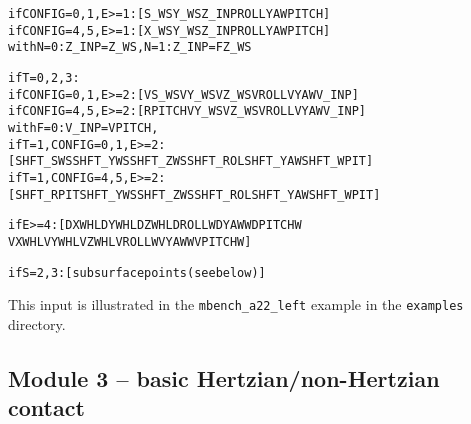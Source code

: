 \documentclass[12pt]{report}
\renewcommand{\magenta}[1]{}
\begin{document}
\begin{alltt}
if CONFIG=0,1, E>=1: [ S\_WS    Y\_WS    Z\_INP  ROLL    YAW    PITCH    ]
if CONFIG=4,5, E>=1: [ X\_WS    Y\_WS    Z\_INP  ROLL    YAW    PITCH    ]
   with  N=0:\magenta{  } Z\_INP = Z\_WS,   N=1: Z\_INP = FZ\_WS

if T=0,2,3:
if CONFIG=0,1, E>=2: [ VS\_WS   VY\_WS   VZ\_WS  VROLL   VYAW   V\_INP    ]
if CONFIG=4,5, E>=2: [ RPITCH  VY\_WS   VZ\_WS  VROLL   VYAW   V\_INP    ]
   with  F=0\magenta{,3}: V\_INP = VPITCH, \magenta{F=1: V\_INP = FX\_WS, F=2: V\_INP = MY\_WS}
if T=1, CONFIG=0,1, E>=2: 
          [ SHFT\_SWS   SHFT\_YWS  SHFT\_ZWS  SHFT\_ROL  SHFT\_YAW  SHFT\_WPIT ]
if T=1, CONFIG=4,5, E>=2: 
          [ SHFT\_RPIT  SHFT\_YWS  SHFT\_ZWS  SHFT\_ROL  SHFT\_YAW  SHFT\_WPIT ]

% Information on flexible wheelset deviations (section \ref{sec:wheelset_geom}):

if E>=4:    [ DXWHL    DYWHL    DZWHL    DROLLW   DYAWW    DPITCHW 
              VXWHL    VYWHL    VZWHL    VROLLW   VYAWW    VPITCHW    ]

% Subsurface stress calculation (section \ref{sec:subsurf}):

if S=2,3: [ subsurface points (see below) ]
\end{alltt}
This input is illustrated in the {\tt mbench\_a22\_left} example in the
{\tt examples} directory.

\color{black}


\subsection{Module 3 -- basic Hertzian/non-Hertzian contact}
\end{document}

